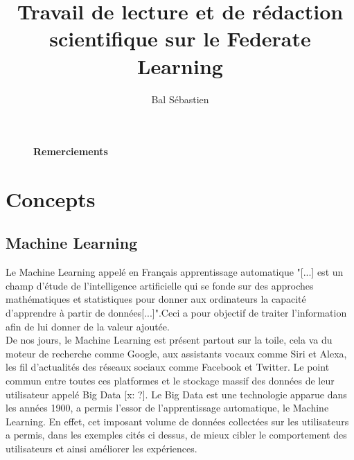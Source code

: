 \documentclass[12pt,a4paper]{report}
\begin{document}
\title{\Large{\Large {Travail de lecture et de rédaction scientifique sur le Federate Learning}}}

\author{Bal Sébastien}

\maketitle

\thispagestyle{empty} %

\fancyhead[LE,RO]{\leftmark}

\fancyhead[RE,LO]{}



 


\begin{figure}[p]

\large\textbf{Remerciements}


\end{figure}

\tableofcontents
\thispagestyle{empty} %

\fancyfoot[R]{\thepage}

\chapter{Concepts}
\section{Machine Learning}
\thispagestyle{plain}\setcounter{page}{1} %
Le Machine Learning appelé en Français apprentissage automatique "[...] est un champ d'étude de l'intelligence artificielle qui se fonde sur des approches mathématiques et statistiques pour donner aux ordinateurs la capacité d'apprendre à partir de données[...]".Ceci a pour objectif de traiter l'information afin de lui donner de la valeur ajoutée.\\

De nos jours, le Machine Learning est présent partout sur la toile, cela va du moteur de recherche comme Google, aux assistants vocaux comme Siri et Alexa, les fil d'actualités des réseaux sociaux comme Facebook et Twitter. Le point commun entre toutes ces platformes et le stockage massif des données de leur utilisateur appelé Big Data [x: ?]. Le Big Data est une technologie apparue dans les années 1900, a permis l'essor de l'apprentissage automatique, le Machine Learning. En effet, cet imposant volume de données collectées sur les utilisateurs a permis, dans les exemples cités ci dessus, de mieux cibler le comportement des utilisateurs et ainsi améliorer les expériences.\\
\end{document}
